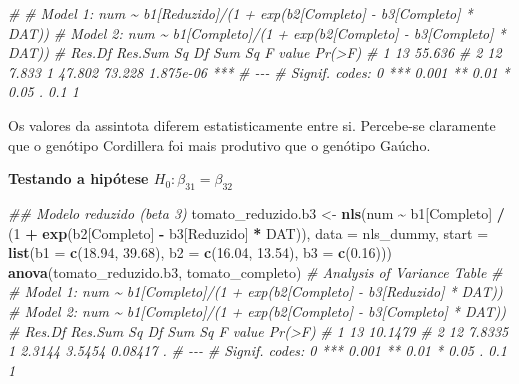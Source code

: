 \documentclass[
]{book}
\newenvironment{Shaded}{\begin{snugshade}}{\end{snugshade}}
\newcommand{\CommentTok}[1]{\textcolor[rgb]{0.56,0.35,0.01}{\textit{#1}}}
\newcommand{\DataTypeTok}[1]{\textcolor[rgb]{0.13,0.29,0.53}{#1}}
\newcommand{\DecValTok}[1]{\textcolor[rgb]{0.00,0.00,0.81}{#1}}
\newcommand{\FloatTok}[1]{\textcolor[rgb]{0.00,0.00,0.81}{#1}}
\newcommand{\KeywordTok}[1]{\textcolor[rgb]{0.13,0.29,0.53}{\textbf{#1}}}
\newcommand{\NormalTok}[1]{#1}
\newcommand{\OperatorTok}[1]{\textcolor[rgb]{0.81,0.36,0.00}{\textbf{#1}}}
\newcommand{\StringTok}[1]{\textcolor[rgb]{0.31,0.60,0.02}{#1}}
\numberwithin{equation}{section}
\begin{document}
\begin{Shaded}
\begin{Highlighting}[]
\CommentTok{\# }
\CommentTok{\# Model 1: num \textasciitilde{} b1[Reduzido]/(1 + exp(b2[Completo] {-} b3[Completo] * DAT))}
\CommentTok{\# Model 2: num \textasciitilde{} b1[Completo]/(1 + exp(b2[Completo] {-} b3[Completo] * DAT))}
\CommentTok{\#   Res.Df Res.Sum Sq Df Sum Sq F value    Pr(\textgreater{}F)    }
\CommentTok{\# 1     13     55.636                                }
\CommentTok{\# 2     12      7.833  1 47.802  73.228 1.875e{-}06 ***}
\CommentTok{\# {-}{-}{-}}
\CommentTok{\# Signif. codes:  0 \textquotesingle{}***\textquotesingle{} 0.001 \textquotesingle{}**\textquotesingle{} 0.01 \textquotesingle{}*\textquotesingle{} 0.05 \textquotesingle{}.\textquotesingle{} 0.1 \textquotesingle{} \textquotesingle{} 1}
\end{Highlighting}
\end{Shaded}

Os valores da assintota diferem estatisticamente entre si. Percebe-se claramente que o genótipo Cordillera foi mais produtivo que o genótipo Gaúcho.

\textbf{Testando a hipótese \(H_0:\beta_{31} = \beta_{32}\)}

\begin{Shaded}
\begin{Highlighting}[]
\CommentTok{\#\# Modelo reduzido (beta 3)}
\NormalTok{tomato\_reduzido.b3 \textless{}{-}}\StringTok{ }
\StringTok{  }\KeywordTok{nls}\NormalTok{(num }\OperatorTok{\textasciitilde{}}\StringTok{ }\NormalTok{b1[Completo] }\OperatorTok{/}\StringTok{ }\NormalTok{(}\DecValTok{1} \OperatorTok{+}\StringTok{ }\KeywordTok{exp}\NormalTok{(b2[Completo] }\OperatorTok{{-}}\StringTok{ }\NormalTok{b3[Reduzido] }\OperatorTok{*}\StringTok{ }\NormalTok{DAT)), }
      \DataTypeTok{data =}\NormalTok{ nls\_dummy,}
      \DataTypeTok{start =} \KeywordTok{list}\NormalTok{(}\DataTypeTok{b1 =} \KeywordTok{c}\NormalTok{(}\FloatTok{18.94}\NormalTok{, }\FloatTok{39.68}\NormalTok{),}
                   \DataTypeTok{b2 =} \KeywordTok{c}\NormalTok{(}\FloatTok{16.04}\NormalTok{, }\FloatTok{13.54}\NormalTok{),}
                   \DataTypeTok{b3 =} \KeywordTok{c}\NormalTok{(}\FloatTok{0.16}\NormalTok{)))}
\KeywordTok{anova}\NormalTok{(tomato\_reduzido.b3, tomato\_completo)}
\CommentTok{\# Analysis of Variance Table}
\CommentTok{\# }
\CommentTok{\# Model 1: num \textasciitilde{} b1[Completo]/(1 + exp(b2[Completo] {-} b3[Reduzido] * DAT))}
\CommentTok{\# Model 2: num \textasciitilde{} b1[Completo]/(1 + exp(b2[Completo] {-} b3[Completo] * DAT))}
\CommentTok{\#   Res.Df Res.Sum Sq Df Sum Sq F value  Pr(\textgreater{}F)  }
\CommentTok{\# 1     13    10.1479                            }
\CommentTok{\# 2     12     7.8335  1 2.3144  3.5454 0.08417 .}
\CommentTok{\# {-}{-}{-}}
\CommentTok{\# Signif. codes:  0 \textquotesingle{}***\textquotesingle{} 0.001 \textquotesingle{}**\textquotesingle{} 0.01 \textquotesingle{}*\textquotesingle{} 0.05 \textquotesingle{}.\textquotesingle{} 0.1 \textquotesingle{} \textquotesingle{} 1}
\end{Highlighting}
\end{Shaded}
\end{document}
